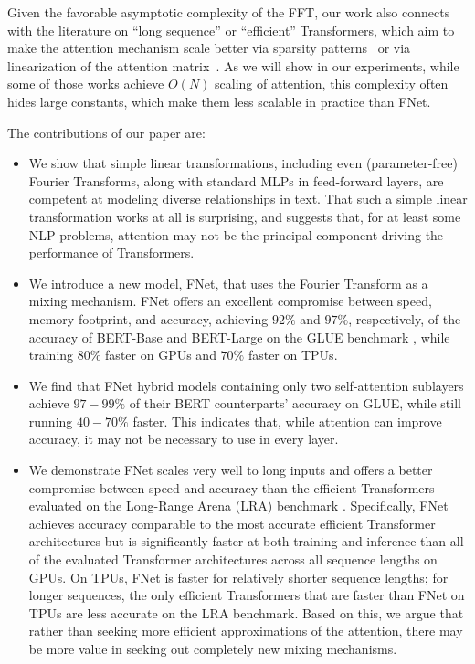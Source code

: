 Given the favorable asymptotic complexity of the FFT, our work also connects with the literature on ``long sequence'' or ``efficient'' Transformers, which aim to make the attention mechanism scale better via sparsity patterns~\citep{child2019generating, qiu2019blockwise, parmar2018image, beltagy2020longformer, ainslie2020etc, zaheer2020big, wang2020linformer, tay2020sparse, tay2020synthesizer, kitaev2020reformer, roy2021efficient, vyas2020fast, liu2018generating} or via linearization of the attention matrix~\citep{katharopoulos2020transformers, choromanski2020rethinking, peng2021random}. As we will show in our experiments, while some of those works achieve $O(N)$ scaling of attention, this complexity often hides large constants, which make them less scalable in practice than FNet.

The contributions of our paper are:
\begin{itemize}
    \item We show that simple linear transformations, including even (parameter-free) Fourier Transforms, along with standard MLPs in feed-forward layers, are competent at modeling diverse relationships in text. That such a simple linear transformation works at all is surprising, and suggests that, for at least some NLP problems, attention may not be the principal component driving the performance of Transformers.
    \item We introduce a new model, FNet, that uses the Fourier Transform as a mixing mechanism.  FNet offers an excellent compromise between speed, memory footprint, and accuracy, achieving $92\%$ and $97\%$, respectively, of the accuracy of BERT-Base and BERT-Large \citep{devlin2018bert} on the GLUE benchmark \citep{wang2018glue}, while training $80\%$ faster on GPUs and $70\%$ faster on TPUs. 
    \item We find that FNet hybrid models containing only two self-attention sublayers achieve $97-99\%$ of their BERT counterparts' accuracy on GLUE, while still running $40-70\%$ faster. This indicates that, while attention can improve accuracy, it may not be necessary to use in every layer.
    \item We demonstrate FNet scales very well to long inputs and offers a better compromise between speed and accuracy than the efficient Transformers evaluated on the Long-Range Arena (LRA) benchmark \citep{tay2020long}.
    Specifically, FNet achieves accuracy comparable to the most accurate efficient Transformer architectures but is significantly faster at both training and inference than all of the evaluated Transformer architectures across all sequence lengths on GPUs. On TPUs, FNet is faster for relatively shorter sequence lengths; for longer sequences, the only efficient Transformers that are faster than FNet on TPUs are less accurate on the LRA benchmark.
    Based on this, we argue that rather than seeking more efficient approximations of the attention, there may be more value in seeking out completely new mixing mechanisms.
\end{itemize}
